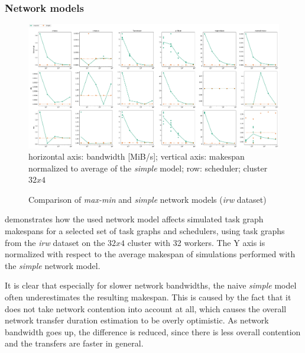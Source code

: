 \subsubsection*{Network models}

\begin{figure}
	\centering
	\includegraphics[width=\textwidth]{imgs/estee/charts/irw-32x4-netmodel-score}\\
	{\small horizontal axis: bandwidth [MiB/s]; vertical axis: makespan normalized to
	average of the \emph{simple} model; row: scheduler; cluster $32x4$}
	\caption{Comparison of \emph{max-min} and \emph{simple} network models
	(\emph{irw} dataset)} \label{fig:estee-chart-irw-netmodel}
\end{figure}


 demonstrates how the used network model affects simulated task
graph makespans for a selected set of task graphs and schedulers, using task graphs from the
\emph{irw} dataset on the $32x4$ cluster with 32 workers. The Y axis
is normalized with respect to the average makespan of simulations performed with the
\emph{simple} network model.

It is clear that especially for slower network bandwidths, the naive \emph{simple} model
often underestimates the resulting makespan. This is caused by the fact that it does not take
network contention into account at all, which causes the overall network transfer duration
estimation to be overly optimistic. As network bandwidth goes up, the difference is reduced, since
there is less overall contention and the transfers are faster in general.

